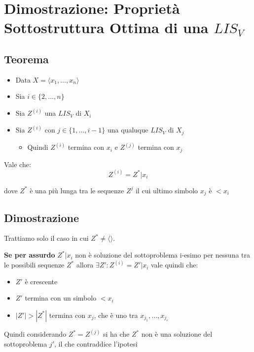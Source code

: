 \newpage
\section{Dimostrazione: Proprietà Sottostruttura Ottima di una $LIS_V$}
\subsection{Teorema}
\begin{itemize}
    \item Data $X= \langle x_1, \dots, x_n \rangle$
    \item Sia $i\in \{2,\dots,n\}$
    \item Sia $Z^{(i)}$ una $LIS_V$ di $X_i$
    \item Sia $Z^{(i)}$ con $j \in \{1,\dots,i-1\}$ una qualuque $LIS_V$ di $X_j$
    \begin{itemize}
        \item Quindi $Z^{(i)}$ termina con $x_i$ e $Z^{(j)}$ termina con $x_j$
    \end{itemize}
\end{itemize}

Vale che:
{
    \large
    $$Z^{(i)} = Z^* | x_i$$
}

dove $Z^*$ è una più lunga tra le sequenze $Z^{j}$ il cui ultimo simbolo $x_j$ è $<x_i$ 

\subsection{Dimostrazione}
Trattiamo solo il caso in cui $Z^* \not = \langle \rangle$.

\textbf{Se per assurdo} $Z^*|x_i$ non è soluzione del sottoproblema i-esimo per nessuna tra le possibili sequenze $Z^*$ allora 
$\exists Z' : Z^{(i)} = Z'|x_i$ vale quindi che:
\begin{itemize}
    \item $Z'$ è crescente
    \item $Z'$ termina con un simbolo $<x_i$
    \item $|Z'|>|Z^*|$ termina con $x_j$, che è uno tra $x_{j_1},\dots,x_{j_e}$
\end{itemize}

Quindi considerando $Z^* = Z^{(j)}$ si ha che $Z^*$ non è una soluzione del sottoproblema $j'$, il che contraddice l'ipotesi